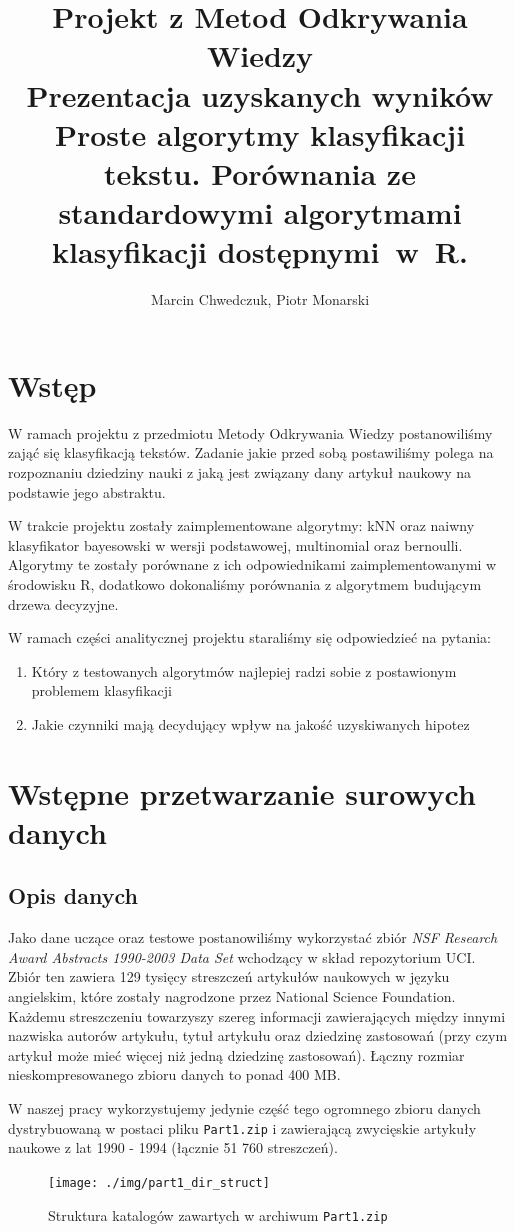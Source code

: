 \documentclass[a4paper,12pt]{article}
\title{Projekt z Metod Odkrywania Wiedzy\\Prezentacja uzyskanych wyników\\\Large{Proste algorytmy klasyfikacji tekstu. Porównania ze standardowymi algorytmami klasyfikacji dostępnymi~w~R.}\\}
\author{Marcin Chwedczuk, Piotr Monarski}
\date{}
\begin{document}
\maketitle

\section{Wstęp}
W ramach projektu z przedmiotu Metody Odkrywania Wiedzy 
postanowiliśmy zająć się klasyfikacją tekstów. 
Zadanie jakie przed sobą postawiliśmy polega na rozpoznaniu
dziedziny nauki z jaką jest związany dany artykuł naukowy
na podstawie jego abstraktu.

W trakcie projektu zostały zaimplementowane
algorytmy: kNN oraz naiwny klasyfikator bayesowski w wersji
podstawowej, multinomial oraz bernoulli.
Algorytmy te zostały porównane z ich odpowiednikami 
zaimplementowanymi w środowisku R, dodatkowo dokonaliśmy 
porównania z algorytmem budującym drzewa decyzyjne.
 
W ramach części analitycznej projektu staraliśmy się odpowiedzieć na
pytania:
\begin{enumerate}
	\item
		Który z testowanych algorytmów 
		najlepiej radzi sobie z postawionym
		problemem klasyfikacji
	\item
		Jakie czynniki mają decydujący wpływ na jakość
		uzyskiwanych hipotez
\end{enumerate}

\section{Wstępne przetwarzanie surowych danych}
	\subsection{Opis danych}
		Jako dane uczące oraz testowe postanowiliśmy wykorzystać
		zbiór \textit{NSF Research Award Abstracts 1990-2003 Data Set}
		\cite{abstracts}
		wchodzący w skład repozytorium UCI.
		Zbiór ten zawiera 129 tysięcy streszczeń artykułów naukowych 
		w języku angielskim,
		które zostały nagrodzone przez National Science Foundation.
		Każdemu streszczeniu towarzyszy szereg informacji zawierających
		między innymi nazwiska autorów artykułu, tytuł artykułu oraz
		dziedzinę zastosowań (przy czym artykuł może mieć więcej 
		niż jedną dziedzinę zastosowań).
		Łączny rozmiar nieskompresowanego zbioru danych to ponad 400 MB.
		
		W naszej pracy wykorzystujemy jedynie część tego ogromnego zbioru 
		danych dystrybuowaną w postaci pliku \texttt{Part1.zip} i zawierającą
		zwycięskie artykuły naukowe z lat 1990 - 1994 (łącznie 51 760 streszczeń).
		\begin{figure}[htb]
			\centering
			\texttt{[image: ./img/part1\_dir\_struct]}
			\caption{Struktura katalogów zawartych w archiwum \texttt{Part1.zip}}
		\end{figure}
		
\end{document}
